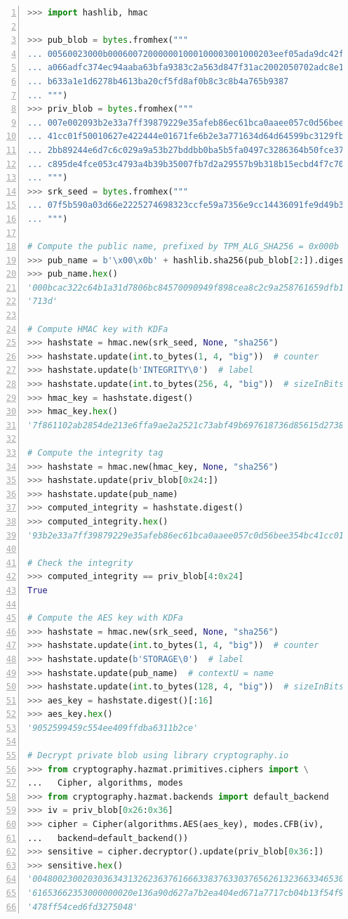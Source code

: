 \begin{lstlisting}[language=Python, numbers=left, caption={Python session which decrypts a private key blob using the \texttt{seedValue} of the SRK and the \emph{public name} associated with the key}, label=protectingsshauthenticationwithtpm20:seedderivation]
>>> import hashlib, hmac

>>> pub_blob = bytes.fromhex("""
... 00560023000b000600720000001000100003001000203eef05ada9dc42f69ffc
... a066adfc374ec94aaba63bfa9383c2a563d847f31ac2002050702adc8e1081d1
... b633a1e1d6278b4613ba20cf5fd8af0b8c3c8b4a765b9387
... """)
>>> priv_blob = bytes.fromhex("""
... 007e002093b2e33a7ff39879229e35afeb86ec61bca0aaee057c0d56bee354bc
... 41cc01f50010627e422444e01671fe6b2e3a771634d64d64599bc3129fb57f10
... 2bb89244e6d7c6c029a9a53b27bddbb0ba5b5fa0497c3286364b50fce3757615
... c895de4fce053c4793a4b39b35007fb7d2a29557b9b318b15ecbd4f7c70908a8
... """)
>>> srk_seed = bytes.fromhex("""
... 07f5b590a03d66e2225274698323ccfe59a7356e9cc14436091fe9d49b3e577c
... """)

# Compute the public name, prefixed by TPM_ALG_SHA256 = 0x000b
>>> pub_name = b'\x00\x0b' + hashlib.sha256(pub_blob[2:]).digest()
>>> pub_name.hex()
'000bcac322c64b1a31d7806bc84570090949f898cea8c2c9a258761659dfb1de'
'713d'

# Compute HMAC key with KDFa
>>> hashstate = hmac.new(srk_seed, None, "sha256")
>>> hashstate.update(int.to_bytes(1, 4, "big"))  # counter
>>> hashstate.update(b'INTEGRITY\0')  # label
>>> hashstate.update(int.to_bytes(256, 4, "big"))  # sizeInBits
>>> hmac_key = hashstate.digest()
>>> hmac_key.hex()
'7f861102ab2854de213e6ffa9ae2a2521c73abf49b697618736d85615d27389b'

# Compute the integrity tag
>>> hashstate = hmac.new(hmac_key, None, "sha256")
>>> hashstate.update(priv_blob[0x24:])
>>> hashstate.update(pub_name)
>>> computed_integrity = hashstate.digest()
>>> computed_integrity.hex()
'93b2e33a7ff39879229e35afeb86ec61bca0aaee057c0d56bee354bc41cc01f5'

# Check the integrity
>>> computed_integrity == priv_blob[4:0x24]
True

# Compute the AES key with KDFa
>>> hashstate = hmac.new(srk_seed, None, "sha256")
>>> hashstate.update(int.to_bytes(1, 4, "big"))  # counter
>>> hashstate.update(b'STORAGE\0')  # label
>>> hashstate.update(pub_name)  # contextU = name
>>> hashstate.update(int.to_bytes(128, 4, "big"))  # sizeInBits
>>> aes_key = hashstate.digest()[:16]
>>> aes_key.hex()
'9052599459c554ee409ffdba6311b2ce'

# Decrypt private blob using library cryptography.io
>>> from cryptography.hazmat.primitives.ciphers import \
...   Cipher, algorithms, modes
>>> from cryptography.hazmat.backends import default_backend
>>> iv = priv_blob[0x26:0x36]
>>> cipher = Cipher(algorithms.AES(aes_key), modes.CFB(iv),
...   backend=default_backend())
>>> sensitive = cipher.decryptor().update(priv_blob[0x36:])
>>> sensitive.hex()
'0048002300203036343132623637616663383763303765626132366334653031'
'61653662353000000020e136a90d627a7b2ea404ed671a7717cb04b13f54f9df'
'478ff54ced6fd3275048'
\end{lstlisting}

